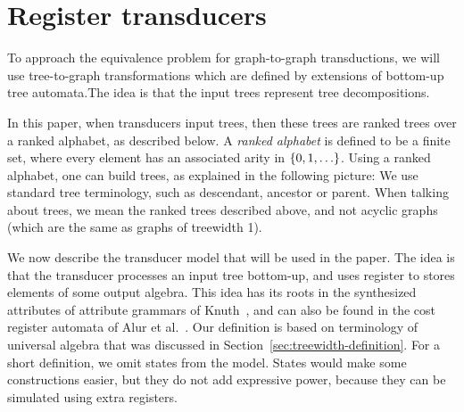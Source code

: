 \section{Register transducers}\label{sec:register-transducers}
To approach the equivalence problem for graph-to-graph transductions, we will use tree-to-graph transformations which are defined by extensions of bottom-up tree automata.The idea is that the input trees represent tree decompositions.

In this paper, when transducers input trees, then these trees are  ranked trees over a ranked alphabet, as described below. A \emph{ranked alphabet} is defined to be  a finite set, where every element has an associated arity in $\{0,1,\ldots\}$. Using a ranked alphabet, one can build trees, as explained in the following picture:
We use standard tree terminology, such as descendant, ancestor or parent. When talking about trees, we mean the ranked trees described above, and not acyclic graphs (which are the same as graphs of treewidth 1). 

We now describe the transducer model that will be used in the paper. The idea is that the transducer processes an input tree bottom-up, and uses register to stores elements of some output algebra.  This idea has its roots in the synthesized attributes of attribute grammars of Knuth~\cite{Knuth:1968aa}, and can also be found in the cost register automata of Alur et al.~\cite[p.~15]{alurDantoniDeshmukhYuan2013}. Our definition is based on  terminology of universal algebra that was discussed in Section~\ref{sec:treewidth-definition}.
For a short definition, we omit states from the model.  States would make some constructions easier, but they do not add expressive power, because they  can be simulated using extra registers.

